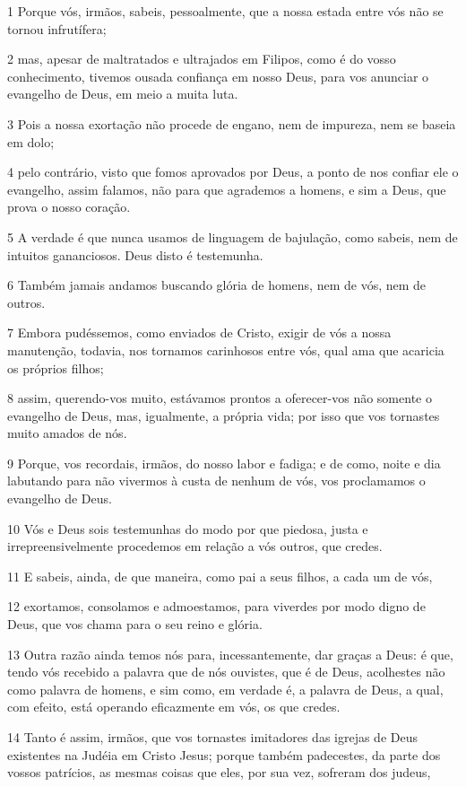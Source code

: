\par 1 Porque vós, irmãos, sabeis, pessoalmente, que a nossa estada entre vós não se tornou infrutífera;
\par 2 mas, apesar de maltratados e ultrajados em Filipos, como é do vosso conhecimento, tivemos ousada confiança em nosso Deus, para vos anunciar o evangelho de Deus, em meio a muita luta.
\par 3 Pois a nossa exortação não procede de engano, nem de impureza, nem se baseia em dolo;
\par 4 pelo contrário, visto que fomos aprovados por Deus, a ponto de nos confiar ele o evangelho, assim falamos, não para que agrademos a homens, e sim a Deus, que prova o nosso coração.
\par 5 A verdade é que nunca usamos de linguagem de bajulação, como sabeis, nem de intuitos gananciosos. Deus disto é testemunha.
\par 6 Também jamais andamos buscando glória de homens, nem de vós, nem de outros.
\par 7 Embora pudéssemos, como enviados de Cristo, exigir de vós a nossa manutenção, todavia, nos tornamos carinhosos entre vós, qual ama que acaricia os próprios filhos;
\par 8 assim, querendo-vos muito, estávamos prontos a oferecer-vos não somente o evangelho de Deus, mas, igualmente, a própria vida; por isso que vos tornastes muito amados de nós.
\par 9 Porque, vos recordais, irmãos, do nosso labor e fadiga; e de como, noite e dia labutando para não vivermos à custa de nenhum de vós, vos proclamamos o evangelho de Deus.
\par 10 Vós e Deus sois testemunhas do modo por que piedosa, justa e irrepreensivelmente procedemos em relação a vós outros, que credes.
\par 11 E sabeis, ainda, de que maneira, como pai a seus filhos, a cada um de vós,
\par 12 exortamos, consolamos e admoestamos, para viverdes por modo digno de Deus, que vos chama para o seu reino e glória.
\par 13 Outra razão ainda temos nós para, incessantemente, dar graças a Deus: é que, tendo vós recebido a palavra que de nós ouvistes, que é de Deus, acolhestes não como palavra de homens, e sim como, em verdade é, a palavra de Deus, a qual, com efeito, está operando eficazmente em vós, os que credes.
\par 14 Tanto é assim, irmãos, que vos tornastes imitadores das igrejas de Deus existentes na Judéia em Cristo Jesus; porque também padecestes, da parte dos vossos patrícios, as mesmas coisas que eles, por sua vez, sofreram dos judeus,

